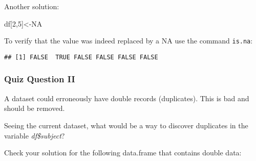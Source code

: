 \documentclass[
]{article}
\newenvironment{Shaded}{\begin{snugshade}}{\end{snugshade}}
\newcommand{\ConstantTok}[1]{\textcolor[rgb]{0.00,0.00,0.00}{#1}}
\newcommand{\DecValTok}[1]{\textcolor[rgb]{0.00,0.00,0.81}{#1}}
\newcommand{\FunctionTok}[1]{\textcolor[rgb]{0.00,0.00,0.00}{#1}}
\newcommand{\NormalTok}[1]{#1}
\newcommand{\OtherTok}[1]{\textcolor[rgb]{0.56,0.35,0.01}{#1}}
\newcommand{\SpecialCharTok}[1]{\textcolor[rgb]{0.00,0.00,0.00}{#1}}
\begin{document}
Another solution:

\begin{Shaded}
\begin{Highlighting}[]
\NormalTok{df[}\DecValTok{2}\NormalTok{,}\DecValTok{5}\NormalTok{]}\OtherTok{\textless{}{-}}\ConstantTok{NA}
\end{Highlighting}
\end{Shaded}

To verify that the value was indeed replaced by a NA use the command
\texttt{is.na}:

\begin{Shaded}
\end{Shaded}

\begin{verbatim}
## [1] FALSE  TRUE FALSE FALSE FALSE FALSE
\end{verbatim}

\hypertarget{quiz-question-ii}{%
\subsubsection{Quiz Question II}\label{quiz-question-ii}}

A dataset could erroneously have double records (duplicates). This is
bad and should be removed.

Seeing the current dataset, what would be a way to discover duplicates
in the variable \emph{df\$subject}?

Check your solution for the following data.frame that contains double
data:
\end{document}
